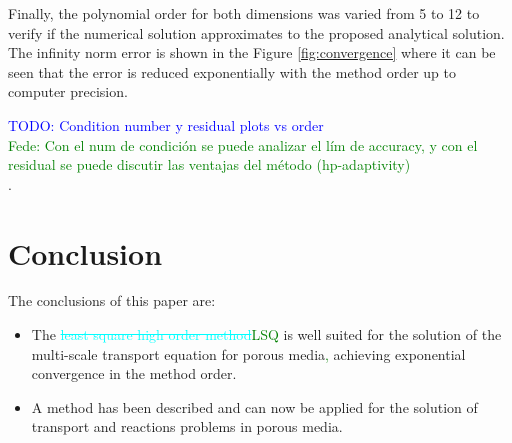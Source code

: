 \documentclass{CFD2011}
\newcommand{\TODO}[1]{\textcolor{blue}{TODO: #1} \\}
\newcommand{\Fede}[1]{\textcolor{green}{Fede: #1} \\}
\newcommand{\newf}[1]{\textcolor{green}{#1}}
\newcommand{\nof}[1]{\textcolor{cyan}{{\sout{#1}}}}
\begin{document}



Finally, the polynomial order for both dimensions was varied from 5 to 12 to verify if the numerical solution approximates to the proposed analytical solution. The infinity norm error is shown in the Figure \ref{fig:convergence} where it can be seen that the error is reduced exponentially with the method order up to computer precision.

\TODO{Condition number y residual plots vs order}
\Fede{Con el num de condici\'on se puede analizar el l\'im de accuracy, y con el residual se puede discutir las ventajas del m\'etodo (hp-adaptivity)}.


\section{Conclusion}

The conclusions of this paper are:

\begin{itemize}
\item The \nof{least square high order method}\newf{LSQ} is well suited for the solution of the multi-scale transport equation for porous media\newf{,} achieving exponential convergence in the method order.
\item A method has been described and can now be applied for the solution of transport and reactions problems in porous media.
\end{itemize}
\end{document}
